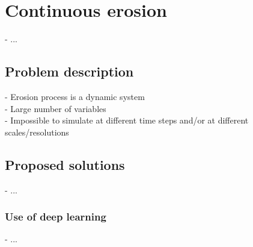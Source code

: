 \chapter{Continuous erosion}
\label{chap:continuous-erosion}
\minitoc

- ...

\section{Problem description}
\label{sec:continuous-erosion-problematic}
- Erosion process is a dynamic system \\
- Large number of variables \\
- Impossible to simulate at different time steps and/or at different scales/resolutions

\section{Proposed solutions}
\label{sec:continuous-erosion-solutions}
- ...

\subsection{Use of deep learning}
- ...
